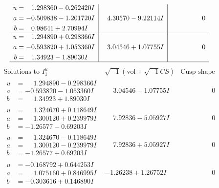 \documentclass[1p]{elsarticle_modified}
\theoremstyle{definition}
\newcommand{\I}{\sqrt{-1}}
\begin{document}
$$\begin{array}{c|c|c}
\begin{aligned}
u &= \phantom{-}1.298360 - 0.262420 I \\
a &= -0.509838 - 1.201720 I \\
b &= \phantom{-}0.98641 + 2.70994 I\end{aligned}
 & \phantom{-}4.30570 - 9.22114 I & \phantom{-0.000000 } 0 \\ \hline\begin{aligned}
u &= \phantom{-}1.294890 + 0.298366 I \\
a &= -0.593820 + 1.053360 I \\
b &= \phantom{-}1.34923 - 1.89030 I\end{aligned}
 & \phantom{-}3.04546 + 1.07755 I & \phantom{-0.000000 } 0\\
 \hline 
 \end{array}$$\newpage$$\begin{array}{c|c|c}  
\text{Solutions to }I^u_{1}& \I (\text{vol} + \sqrt{-1}CS) & \text{Cusp shape}\\
 \hline 
\begin{aligned}
u &= \phantom{-}1.294890 - 0.298366 I \\
a &= -0.593820 - 1.053360 I \\
b &= \phantom{-}1.34923 + 1.89030 I\end{aligned}
 & \phantom{-}3.04546 - 1.07755 I & \phantom{-0.000000 } 0 \\ \hline\begin{aligned}
u &= \phantom{-}1.324670 + 0.118649 I \\
a &= \phantom{-}1.300120 + 0.239979 I \\
b &= -1.26577 - 0.69203 I\end{aligned}
 & \phantom{-}7.92836 - 5.05927 I & \phantom{-0.000000 } 0 \\ \hline\begin{aligned}
u &= \phantom{-}1.324670 - 0.118649 I \\
a &= \phantom{-}1.300120 - 0.239979 I \\
b &= -1.26577 + 0.69203 I\end{aligned}
 & \phantom{-}7.92836 + 5.05927 I & \phantom{-0.000000 } 0 \\ \hline\begin{aligned}
u &= -0.168792 + 0.644253 I \\
a &= \phantom{-}1.075160 + 0.846995 I \\
b &= -0.303616 + 0.146890 I\end{aligned}
 & -1.26238 + 1.26752 I & \phantom{-0.000000 } 0 \\ \hline\begin{aligned}

\end{aligned}
\end{array}$$
\end{document}
